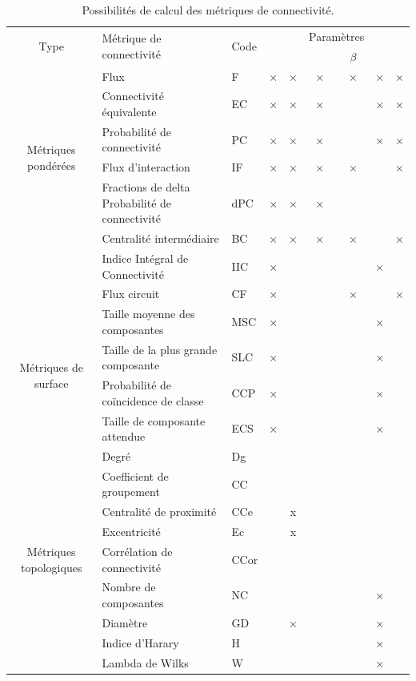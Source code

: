 \documentclass{article}
\begin{document}
\begin{table}[H]
\begin{tabular}{|c|m{5.162cm}|l|c|c|c|c|c|c|}
\hline
\multirow{2}{*}{Type} & \multirow{2}{*}{Métrique de connectivité} & \multirow{2}{*}{Code} & \multirow{2}{1.5cm}{\centering{Capacité des taches}} & \multirow{2}{1.5cm}{\centering{Distance intra-taches}} & \multicolumn{2}{m{1.8cm}|}{\centering Paramètres} & \multirow{2}{1.5cm}{\centering{Graphe par lot}} & \multirow{2}{1.55cm}{\centering{Paramètre par lot}}\\
\hhline{~~~~~--~~}
 & & & & & \multicolumn{1}{m{0.9cm}|}{\centering{$\alpha$}} & $\beta$ & & \\
\hline
\multirow{6}{2cm}{Métriques pondérées}
 & Flux & F & × & × & × & × & × & ×\\
 & Connectivité équivalente & EC & × & × & × &  & × & ×\\
 & Probabilité de connectivité & PC & × & × & × &  & × & ×\\
 & Flux d'interaction & IF & × & × & × & × &  & ×\\
 & Fractions de delta Probabilité de connectivité & dPC & × & × & × &  &  & \\
 & Centralité intermédiaire & BC & × & × & × & × &  & ×\\
 & Indice Intégral de Connectivité & IIC & × &  &  &  & × & \\
 & Flux circuit & CF & × &  &  & × &  & ×\\
\hline
\multirow{4}{2cm}{Métriques de surface}
 & Taille moyenne des composantes & MSC & × &  &  &  & × & \\
 & Taille de la plus grande composante & SLC & × &  &  &  & × & \\
 & Probabilité de coïncidence de classe & CCP & × &  &  &  & × & \\
 & Taille de composante attendue & ECS & × &  &  &  & × & \\
\hline
\multirow{9}{2cm}{Métriques topologiques}
 & Degré & Dg &  &  &  &  &  & \\
 & Coefficient de groupement & CC &  &  &  &  &  & \\
 & Centralité de proximité & CCe &  & x &  &  &  & \\
 & Excentricité & Ec &  & x &  &  &  & \\
 & Corrélation de connectivité & CCor &  &  &  &  &  & \\
 & Nombre de composantes & NC &  &  &  &  & × & \\
 & Diamètre & GD &  & × &  &  & × & \\
 & Indice d’Harary & H &  &  &  &  & × & \\
 & Lambda de Wilks & W &  &  &  &  & × & \\
\hline
\end{tabular}
\caption{Possibilités de calcul des métriques de connectivité.}
\label{metric_poss}
\end{table}
\end{document}
